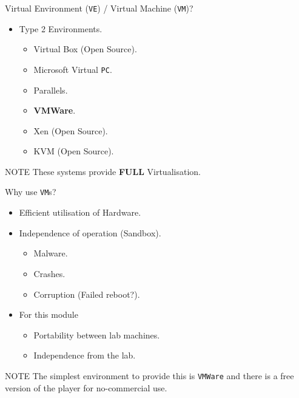\documentclass{beamer}
\begin{document}
\begin{frame}{Virtual Environment (\texttt{VE}) / Virtual Machine (\texttt{VM})?}
  \begin{itemize}
    \item Type 2 Environments.
      \begin{itemize}
        \item Virtual Box (Open Source).
        \item Microsoft Virtual \texttt{PC}.
        \item Parallels.
        \item \textbf{VMWare}.
        \item Xen (Open Source).
        \item KVM (Open Source).
      \end{itemize}  
  \end{itemize}
  \begin{block}{NOTE}
    These systems provide \textbf{FULL} Virtualisation.
  \end{block}
\end{frame}

\begin{frame}{Why use \texttt{VM}s?}
  \begin{itemize}
    \item Efficient utilisation of Hardware.
    \item Independence of operation (Sandbox).
      \begin{itemize}
        \item Malware.
        \item Crashes.
        \item Corruption (Failed reboot?).
      \end{itemize}  
    \item For this module
      \begin{itemize}
        \item Portability between lab machines.
        \item Independence from the lab.
      \end{itemize}  
  \end{itemize}  
  \begin{block}{NOTE}
    The simplest environment to provide this is \texttt{VMWare} and there is a free version of the player for no-commercial use.
  \end{block}
\end{frame}
\end{document}
